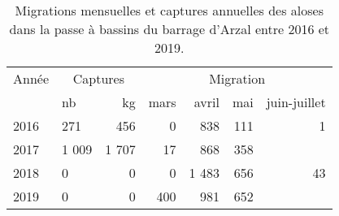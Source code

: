 \begin{table}[htbp]
\centering
\begin{tabular}{llrrrrr}
  \toprule
  Année & \multicolumn{2}{c}{Captures} & \multicolumn{4}{c}{Migration} \\
 & nb & kg & mars & avril & mai & juin-juillet  \\
						 \midrule
2016 & 271 & 456 & 0 & 838 & 111 & 1 \\ 
  2017 & 1 009 & 1 707 & 17 & 868 & 358 &  \\ 
  2018 & 0 & 0 & 0 & 1 483 & 656 & 43 \\ 
  2019 & 0 & 0 & 400 & 981 & 652 &  \\ 
   \bottomrule
\end{tabular}
\caption{Migrations mensuelles et captures annuelles des aloses dans la passe à bassins 
						du barrage d'Arzal entre 2016 et 2019.} 
\label{table_ala_mois}
\end{table}
